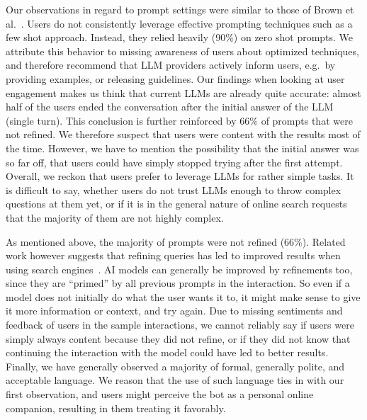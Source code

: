 Our observations in regard to prompt settings were similar to those of Brown et al.~\cite{brown_language_2020}.
Users do not consistently leverage effective prompting techniques such as a few shot approach.
Instead, they relied heavily (90\%) on zero shot prompts.
We attribute this behavior to missing awareness of users about optimized techniques, and
therefore recommend that LLM providers actively inform users, e.g.\ by
providing examples, or releasing guidelines.
Our findings when looking at user engagement makes us think that current LLMs are already
quite accurate: almost half of the users ended the conversation after the initial answer of
the LLM (single turn).
This conclusion is further reinforced by 66\% of prompts that were not refined.
We therefore suspect that users were content with the results most of the time.
However, we have to mention the possibility that the initial answer was so far off,
that users could have simply stopped trying after the first attempt.
Overall, we reckon that users prefer to leverage LLMs for rather simple tasks.
It is difficult to say, whether users do not trust LLMs enough to throw complex questions at
them yet, or if it is in the general nature of online search requests that the majority of
them are not highly complex.

As mentioned above, the majority of prompts were not refined (66\%).
Related work however suggests that refining queries has led to improved results when using search
engines~\cite{huang_analyzing_2009}.
AI models can generally be improved by refinements too, since they are “primed” by all previous
prompts in the interaction.
So even if a model does not initially do what the user wants it to, it might make
sense to give it more information or context, and try again.
Due to missing sentiments and feedback of users in the sample interactions, we cannot reliably say
if users were simply always content because they did not refine, or if they did not know that
continuing the interaction with the model could have led to better results.
Finally, we have generally observed a majority of formal, generally polite, and acceptable language.
We reason that the use of such language ties in with our first observation, and users might perceive
the bot as a personal online companion, resulting in them treating it favorably.

